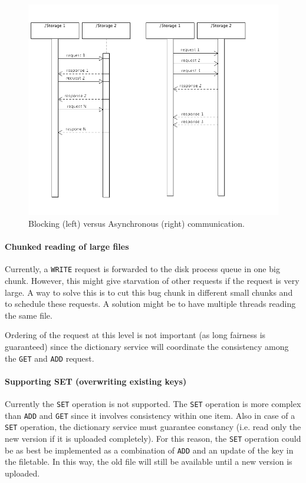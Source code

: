 \documentclass[12pt,a4paper]{scrartcl}
\begin{document}
\begin{figure}[H]
\centering
\includegraphics[width=\textwidth,trim=0 8cm 0 0,clip=true]{diagrams/blocking-async.png}
\caption{Blocking (left) versus Asynchronous (right) communication.}
\label{fig:blocking-async}
\end{figure}

\paragraph{Chunked reading of large files}
Currently, a \verb|WRITE| request is forwarded to the disk process queue in one big chunk. However, this might give starvation of other requests if the request is very large. A way to solve this is to cut this bug chunk in different small chunks and to schedule these requests. A solution might be to have multiple threads reading the same file. 

Ordering of the request at this level is not important (as long fairness is guaranteed) since the dictionary service will coordinate the consistency among the \verb|GET| and \verb|ADD| request.

\paragraph{Supporting SET (overwriting existing keys)}
Currently the \verb|SET| operation is not supported. The \verb|SET| operation is more complex than \verb|ADD| and \verb|GET| since it involves consistency within one item. Also in case of a \verb|SET| operation, the dictionary service must guarantee constancy (i.e. read only the new version if it is uploaded completely). For this reason, the \verb|SET| operation could be as best be implemented as a combination of \verb|ADD| and an update of the key in the filetable. In this way, the old file will still be available until a new version is uploaded.
\end{document}
